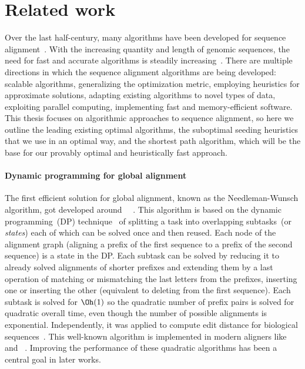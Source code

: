 \section*{Related work}

Over the last half-century, many algorithms have been developed for sequence
alignment~\citep{navarro2001guided}. With the increasing quantity and length of
genomic sequences, the need for fast and accurate algorithms is steadily
increasing~\cite{alser2021technology}. There are multiple directions in which
the sequence alignment algorithms are being developed: scalable algorithms,
generalizing the optimization metric, employing heuristics for approximate
solutions, adapting existing algorithms to novel types of data, exploiting
parallel computing, implementing fast and memory-efficient software. This thesis
focuses on algorithmic approaches to sequence alignment, so here we outline the
leading existing optimal algorithms, the suboptimal seeding heuristics that we
use in an optimal way, and the \A shortest path algorithm, which will be the
base for our provably optimal and heuristically fast approach.

\paragraph{Dynamic programming for global alignment}
The first efficient solution for global alignment, known as the Needleman-Wunsch
algorithm, got developed around~\citeyear{vintsyuk1968speech}~
\cite{vintsyuk1968speech,needleman1970general}. This algorithm is based on the
dynamic programming~(DP) technique~\cite{bellman1954theory} of splitting a task
into overlapping subtasks~(or \emph{states}) each of which can be solved once
and then reused. Each node of the alignment graph (aligning a prefix of the
first sequence to a prefix of the second sequence) is a state in the DP. Each
subtask can be solved by reducing it to already solved alignments of shorter
prefixes and extending them by a last operation of matching or mismatching the
last letters from the prefixes, inserting one or inserting the other
(equivalent to deleting from the first sequence). Each subtask is solved for
$\Oh(1)$ so the quadratic number of prefix pairs is solved for quadratic overall
time, even though the number of possible alignments is exponential.
Independently, it was applied to compute edit distance for biological
sequences~\citep{needleman1970general,sankoff1972matching,sellers1974theory,wagner1974string}.
This well-known algorithm is implemented in modern aligners like
\seqan~\citep{reinert2017seqan} and \parasail~\citep{daily2016parasail}.
Improving the performance of these quadratic algorithms has been a central goal
in later works.

